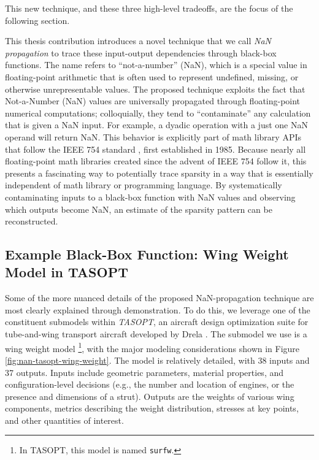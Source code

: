 This new technique, and these three high-level tradeoffs, are the focus of the following section.


This thesis contribution introduces a novel technique that we call \textit{NaN propagation} to trace these input-output dependencies through black-box functions. The name refers to ``not-a-number'' (NaN), which is a special value in floating-point arithmetic that is often used to represent undefined, missing, or otherwise unrepresentable values. The proposed technique exploits the fact that Not-a-Number (NaN) values are universally propagated through floating-point numerical computations; colloquially, they tend to ``contaminate'' any calculation that is given a NaN input. For example, a dyadic operation with a just one NaN operand will return NaN. This behavior is explicitly part of math library APIs that follow the IEEE 754 standard \cite{ieee754}, first established in 1985. Because nearly all floating-point math libraries created since the advent of IEEE 754 follow it, this presents a fascinating way to potentially trace sparsity in a way that is essentially independent of math library or programming language. By systematically contaminating inputs to a black-box function with NaN values and observing which outputs become NaN, an estimate of the sparsity pattern can be reconstructed.

\subsection{Example Black-Box Function: Wing Weight Model in TASOPT}

Some of the more nuanced details of the proposed NaN-propagation technique are most clearly explained through demonstration. To do this, we leverage one of the constituent submodels within \emph{TASOPT}, an aircraft design optimization suite for tube-and-wing transport aircraft developed by Drela \cite{drela_tasopt_2010}. The submodel we use is a wing weight model \footnote{In TASOPT, this model is named \texttt{surfw}.}, with the major modeling considerations shown in Figure \ref{fig:nan-tasopt-wing-weight}. The model is relatively detailed, with 38 inputs and 37 outputs. Inputs include geometric parameters, material properties, and configuration-level decisions (e.g., the number and location of engines, or the presence and dimensions of a strut). Outputs are the weights of various wing components, metrics describing the weight distribution, stresses at key points, and other quantities of interest.

